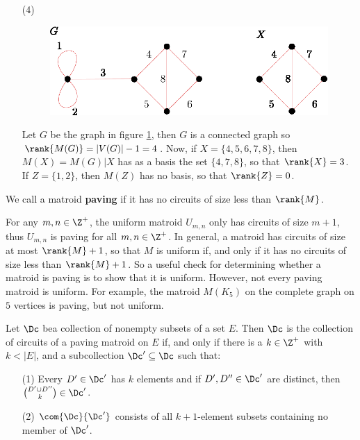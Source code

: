 \begin{example}
\begin{enumerate}
    \item[(4)]
         \begin{figure}[h]
            \centering
            \includegraphics[scale=1.0]{Figures/Chapter1/connected_graph_rank.eps}
            \caption{}
            \label{fig_1.6}
        \end{figure}
        Let $G$ be the graph in figure \ref{fig_1.6}, then $G$ is a connected
        graph so  $\rank{M(G)}=|V(G)|-1=4$. Now, if $X=\{4,5,6,7,8\}$, then
        $M(X)=M(G)|X$ has as a basis the set $\{4,7,8\}$, so that $\rank{X}=3$.
        If $Z=\{1,2\}$, then $M(Z)$ has no basis, so that $\rank{Z}=0$.
    \end{enumerate}
\end{example}

\begin{definition}
    We call a matroid \textbf{paving} if it has no circuits of size less than
    $\rank{M}$.
\end{definition}

\begin{example}\label{1.13}
    For any $m,n \in \Z^+$, the uniform matroid  $U_{m,n}$ only has circuits of
    size $m+1$, thus  $U_{m,n}$ is paving for all $m,n \in \Z^+$. In general, a
    matroid has circuits of size at most  $\rank{M}+1$, so that $M$ is uniform
    if, and only if it has no circuits of size less than $\rank{M}+1$. So a
    useful check for determining whether a matroid is paving is to show that it
    is uniform. However, not every paving matroid is uniform. For example, the
    matroid $M(K_5)$ on the complete graph on $5$ vertices is paving, but not
    uniform.
\end{example}

\begin{theorem}\label{1.3.5}
    Let $\Dc$ bea collection of nonempty subsets of a set $E$. Then  $\Dc$ is
    the collection of circuits of a paving matroid on  $E$ if, and only if there
    is a  $k \in \Z^+$ with  $k<|E|$, and a subcollection  $\Dc' \subseteq \Dc$
    such that:
    \begin{enumerate}
        \item[(1)] Every $D' \in \Dc'$ has  $k$ elements and if  $D',D'' \in
            \Dc'$ are distinct, then ${D' \cup D'' \choose k} \in \Dc'$.

        \item[(2)] $\com{\Dc}{\Dc'}$ consists of all $k+1$-element subsets
            containing no member of  $\Dc'$.
    \end{enumerate}
\end{theorem}
